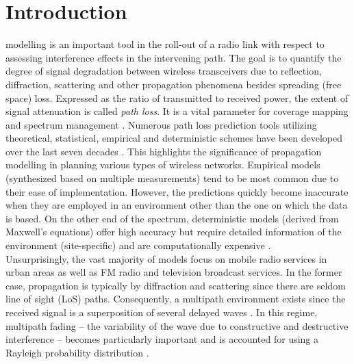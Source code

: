 \documentclass[10pt,journal,twoside]{IEEEtran}
\begin{document}
\section{Introduction}
 modelling is an important tool in the roll-out of a radio link with respect to assessing interference effects in the intervening path. The goal is to quantify the degree of signal degradation between wireless transceivers due to reflection, diffraction, scattering and other propagation phenomena besides spreading (free space) loss. Expressed as the ratio of transmitted to received power, the extent of signal attenuation is called \emph{path loss}. It is a vital parameter for coverage mapping and spectrum management \cite{Rappaport,Seybold}. Numerous path loss prediction tools utilizing theoretical, statistical, empirical and deterministic schemes have been developed over the last seven decades \cite{Phillips:Survey,Sarkar:Survey}. This highlights the significance of propagation modelling in planning various types of wireless networks. %
Empirical models (synthesized based on multiple measurements) tend to be most common due to their ease of implementation. However, the predictions quickly become inaccurate when they are employed in an environment other than the one on which the data is based. On the other end of the spectrum, deterministic models (derived from Maxwell's equations) offer high accuracy but require detailed information of the environment (site-specific) and are computationally expensive \cite{Sarkar:Survey,Abhayawardhana}.\\
Unsurprisingly, the vast majority of models focus on mobile radio services in urban areas as well as FM radio and television broadcast services. In the former case, propagation is typically by diffraction and scattering since there are seldom line of sight (LoS) paths. Consequently, a multipath environment exists since the received signal is a superposition of several delayed waves \cite{Harada:2002}. In this regime, multipath fading -- the variability of the wave due to constructive and destructive interference -- becomes particularly important and is accounted for using a Rayleigh probability distribution \cite{Raisanen:2003}. %
\end{document}
